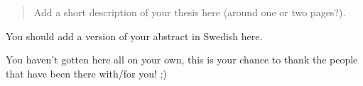 \begin{abstract}
    Add a short description of your thesis here (around one or two pages?).
\end{abstract}



\begin{sammanfattning}
    You should add a version of your abstract in Swedish here.
\end{sammanfattning}



\begin{acknowledgements}
    You haven't gotten here all on your own, this is your chance to thank the people that have been there with/for you! ;)
    
\bigskip

\rightline{\VarPhdName}


\end{acknowledgements}